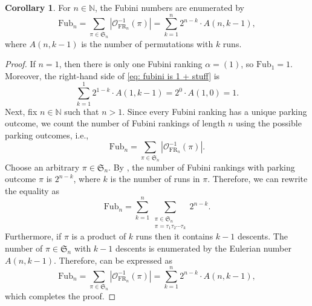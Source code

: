 \documentclass{amsart}
\theoremstyle{definition}
\newtheorem{corollary}{Corollary}[section]
\theoremstyle{definition}
\theoremstyle{remark}
\newcommand{\Fub}{\mathrm{Fub}}
\newcommand{\NN}{\mathbb{N}}
\newcommand{\FR}[1]{\mathrm{FR}_{#1}}
\newcommand{\out}{\mathcal{O}}
\newcommand{\Sym}{\mathfrak{S}}
\begin{document}
\begin{corollary}\label{corr: fubini numbers are odd}
    For $n\in\NN$, the Fubini numbers are enumerated by 
    \begin{equation}\label{eq: fubini is 1 + stuff}
        \Fub_n=\sum_{\pi\in\Sym_n}|\out_{\FR{n}}^{-1}(\pi)|=\sum_{k=1}^{n}2^{n-k}\cdot A(n,k-1),
    \end{equation}
    where $A(n,k-1)$ is the number of permutations with $k$ runs.
\end{corollary}
\begin{proof}
    If $n=1$, then there is only one Fubini ranking $\alpha=(1)$, so $\Fub_1=1$. 
    Moreover, the right-hand side of \eqref{eq: fubini is 1 + stuff} is
    \begin{equation}
        \sum_{k=1}^1 2^{1-k}\cdot A(1,k-1) = 2^0\cdot A(1,0) = 1.
    \end{equation}
    Next, fix $n\in \NN$ such that $n>1$. Since every Fubini ranking has a unique parking outcome, we count the number of Fubini rankings of length $n$ using the possible parking outcomes, i.e., 
    \begin{equation}\label{eq: number of Fub's is sum of outcomes}
    \Fub_n=\sum_{\pi\in\mathfrak{S}_n}\left|\out_{\FR{n}}^{-1}(\pi)\right|. 
    \end{equation}
    Choose an arbitrary $\pi\in\mathfrak{S}_n$. By , the number of Fubini rankings with parking outcome $\pi$ is $2^{n-k}$, where $k$ is the number of runs in $\pi$. 
    Therefore, we can rewrite the equality as \begin{equation}\label{eq: number of Fub's is sum of powers of two}
        \Fub_n=\sum_{k=1}^{n} \sum_{\substack{\pi\in\mathfrak{S}_n \\ \pi = \tau_1\tau_2\cdots\tau_k}}2^{n-k}. 
    \end{equation}
    Furthermore, if $\pi$ is a product of $k$ runs then it contains $k-1$ descents. The number of $\pi\in\mathfrak{S}_n$ with $k-1$ descents is enumerated by the Eulerian number $A(n,k-1)$. Therefore,  can be expressed as
    \begin{equation}\label{eq: the punchline}
        \Fub_n= \sum_{\pi\in\mathfrak{S}_n}\left|\out_{\FR{n}}^{-1}(\pi)\right| = \sum_{k=1}^{n}2^{n-k}\cdot A(n,k-1),
    \end{equation}
    which completes the proof.
\end{proof}
\end{document}
